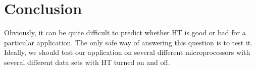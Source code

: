 \documentclass[12pt]{article}
\begin{document}
\section{Conclusion}

Obviously, it can be quite difficult to predict whether HT is good or bad for a particular application. The only safe way of answering this question is to test it. Ideally, we should test our application on several different microprocessors with several different data sets with HT turned on and off.






\end{document}
